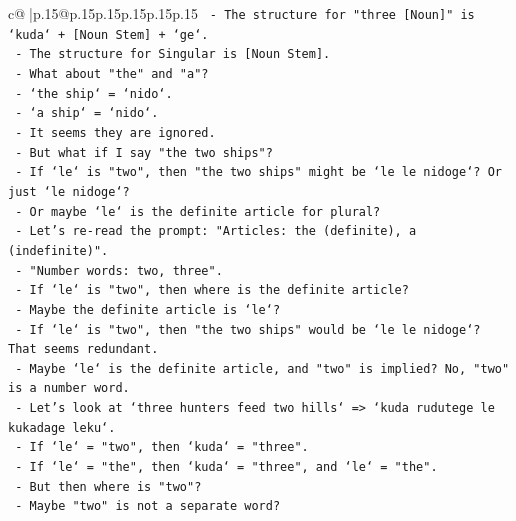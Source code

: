 \documentclass{article}
\begin{document}
{\begin{supertabular}{c@{$\;$}|p{.15\linewidth}@{}p{.15\linewidth}p{.15\linewidth}p{.15\linewidth}p{.15\linewidth}p{.15\linewidth}}
{{{\texttt{                       {-} The structure for "three {[}Noun{]}" is `kuda` + {[}Noun Stem{]} + `ge`.} \\
\texttt{                       {-} The structure for Singular is {[}Noun Stem{]}.} \\
\texttt{                       {-} What about "the" and "a"?} \\
\texttt{                         {-} `the ship` = `nido`.} \\
\texttt{                         {-} `a ship` = `nido`.} \\
\texttt{                         {-} It seems they are ignored.} \\
\texttt{                         {-} But what if I say "the two ships"?} \\
\texttt{                         {-} If `le` is "two", then "the two ships" might be `le le nidoge`? Or just `le nidoge`?} \\
\texttt{                         {-} Or maybe `le` is the definite article for plural?} \\
\texttt{                         {-} Let's re{-}read the prompt: "Articles: the (definite), a (indefinite)".} \\
\texttt{                         {-} "Number words: two, three".} \\
\texttt{                         {-} If `le` is "two", then where is the definite article?} \\
\texttt{                         {-} Maybe the definite article is `le`?} \\
\texttt{                         {-} If `le` is "two", then "the two ships" would be `le le nidoge`? That seems redundant.} \\
\texttt{                         {-} Maybe `le` is the definite article, and "two" is implied? No, "two" is a number word.} \\
\texttt{                         {-} Let's look at `three hunters feed two hills` => `kuda rudutege le kukadage leku`.} \\
\texttt{                           {-} If `le` = "two", then `kuda` = "three".} \\
\texttt{                           {-} If `le` = "the", then `kuda` = "three", and `le` = "the".} \\
\texttt{                           {-} But then where is "two"?} \\
\texttt{                           {-} Maybe "two" is not a separate word?} \\
}}}
\end{supertabular}}
\end{document}

